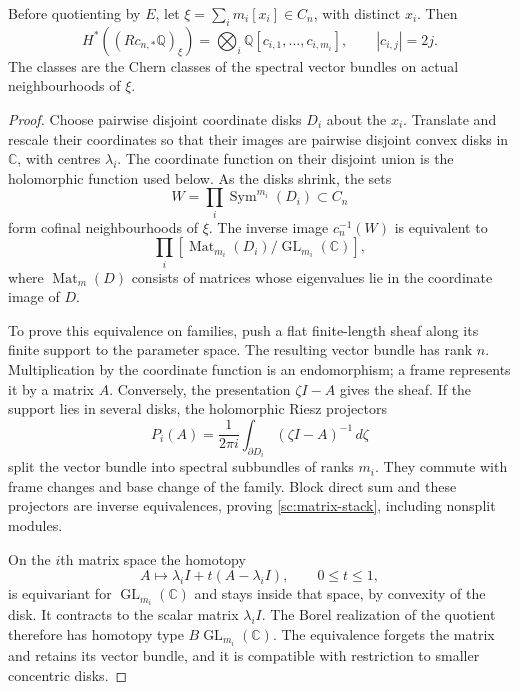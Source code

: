 \begin{lemma}\label{sc:neighbourhoods}
Before quotienting by $E$, let
$\xi=\sum_i m_i[x_i]\in C_n$, with distinct $x_i$.
Then
\begin{equation}\label{sc:stalk-ring}
 H^*((Rc_{n,*}\mathbb Q)_\xi)
  =\bigotimes_i\mathbb Q[c_{i,1},\ldots,c_{i,m_i}],
 \qquad |c_{i,j}|=2j.
\end{equation}
The classes are the Chern classes of the spectral vector bundles
on actual neighbourhoods of $\xi$.
\end{lemma}
\begin{proof}
Choose pairwise disjoint coordinate disks $D_i$ about the $x_i$.
Translate and rescale their coordinates so that their images are
pairwise disjoint convex disks in $\mathbb C$, with centres
$\lambda_i$. The coordinate function on their disjoint union is
the holomorphic function used below. As the disks shrink, the sets
\[
 W=\prod_i\operatorname{Sym}^{m_i}(D_i)\subset C_n
\]
form cofinal neighbourhoods of $\xi$.
The inverse image $c_n^{-1}(W)$ is equivalent to
\begin{equation}\label{sc:matrix-stack}
 \prod_i[\operatorname{Mat}_{m_i}(D_i)/
                                      \operatorname{GL}_{m_i}(\mathbb C)],
\end{equation}
where $\operatorname{Mat}_m(D)$ consists of matrices whose eigenvalues
lie in the coordinate image of $D$.

To prove this equivalence on families, push a flat finite-length sheaf
along its finite support to the parameter space. The resulting vector
bundle has rank $n$. Multiplication by the coordinate function is an
endomorphism; a frame represents it by a matrix $A$. Conversely, the
presentation $\zeta I-A$ gives the sheaf. If the support lies in
several disks, the holomorphic Riesz projectors
\[
 P_i(A)=\frac{1}{2\pi i}\int_{\partial D_i}
                                  (\zeta I-A)^{-1}\,d\zeta
\]
split the vector bundle into spectral subbundles of ranks $m_i$.
They commute with frame changes and base change of the family.
Block direct sum and these projectors are inverse equivalences,
proving \eqref{sc:matrix-stack}, including nonsplit modules.

On the $i$th matrix space the homotopy
\[
 A\longmapsto\lambda_i I+t(A-\lambda_i I),\qquad 0\leq t\leq1,
\]
is equivariant for $\operatorname{GL}_{m_i}(\mathbb C)$ and stays
inside that space, by convexity of the disk. It contracts to the
scalar matrix $\lambda_i I$. The Borel realization of the quotient
therefore has homotopy type $B\operatorname{GL}_{m_i}(\mathbb C)$.
The equivalence forgets the matrix and retains its vector bundle,
and it is compatible with restriction to smaller concentric disks.


\end{proof}
